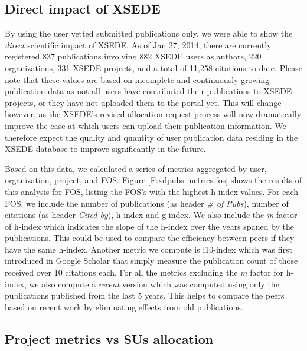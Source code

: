 \documentclass{sig-alternate}
\begin{document}
\subsection{Direct impact of XSEDE} 
 
By using the user vetted submitted publications only, we were able to show the \emph{direct} scientific impact of XSEDE.  As of Jan 27, 2014, there are currently registered 837 publications involving 882 XSEDE users as authors, 220 organizations, 331 XSEDE projects, and a total of 11,258 citations to date. Please note that these values are based on incomplete and continuously growing publication data as not all users have contributed their publications to XSEDE projects, or they have not uploaded them to the portal yet. This will change however, as the XSEDE's revised allocation request process will now dramatically improve the ease at which users can upload their publication information. We therefore expect the quality and quantity of user publication data residing in the XSEDE database to improve significantly in the future. 

Based on this data, we calculated a series of metrics aggregated by user, organization, project, and FOS.  Figure \ref{F:xdpubs-metrics-fos} shows the results of this analysis for FOS, listing the FOS's with the highest h-index values. For each FOS, we include the number of publications (as header \emph{\# of Pubs}), number of citations (as header \emph{Cited by}), h-index and g-index. We also include the \emph{m} factor of h-index which indicates the slope of the h-index over the years spaned by the publications. This could be used to compare the efficiency between peers if they have the same h-index. Another metric we compute is i10-index \cite{www-i10index} which was first introduced in Google Scholar that simply measure the publication count of those received over 10 citations each. For all the metrics excluding the \emph{m} factor for h-index, we also compute a \emph{recent} version which was computed using only the publications published from the last 5 years. This helps to compare the peers based on recent work by eliminating effects from old publications.

 
\subsection{Project metrics vs SUs allocation} 
 
\end{document}
